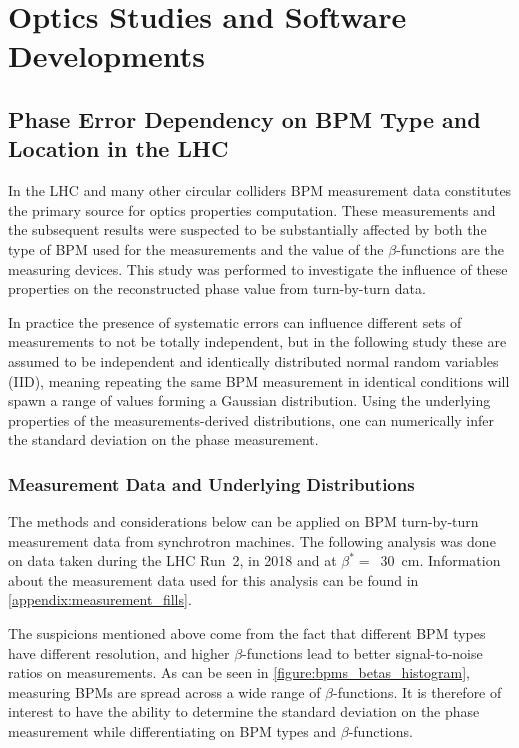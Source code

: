 \chapter{Optics Studies and Software Developments}
\label{chapter:Others_and_Software}


\section{Phase Error Dependency on BPM Type and Location in the LHC}

In the LHC and many other circular colliders BPM measurement data constitutes the primary source for optics properties computation.
These measurements and the subsequent results were suspected to be substantially affected by both the type of BPM used for the measurements and the value of the \(\beta\)-functions are the measuring devices.
This study was performed to investigate the influence of these properties on the reconstructed phase value from turn-by-turn data.

In practice the presence of systematic errors can influence different sets of measurements to not be totally independent, but in the following study these are assumed to be independent and identically distributed normal random variables (IID), meaning repeating the same BPM measurement in identical conditions will spawn a range of values forming a Gaussian distribution.
Using the underlying properties of the measurements-derived distributions, one can numerically infer the standard deviation on the phase measurement. 

\subsection*{Measurement Data and Underlying Distributions}

The methods and considerations below can be applied on BPM turn-by-turn measurement data from synchrotron machines.
The following analysis was done on data taken during the LHC Run~\num{2}, in \num{2018} and at \(\beta^{\ast} =\)~\qty{30}{\centi\meter}.
Information about the measurement data used for this analysis can be found in \cref{appendix:measurement_fills}.

The suspicions mentioned above come from the fact that different BPM types have different resolution, and higher \(\beta\)-functions lead to better signal-to-noise ratios on measurements.
As can be seen in \cref{figure:bpms_betas_histogram}, measuring BPMs are spread across a wide range of \(\beta\)-functions.
It is therefore of interest to have the ability to determine the standard deviation on the phase measurement while differentiating on BPM types and \(\beta\)-functions.


